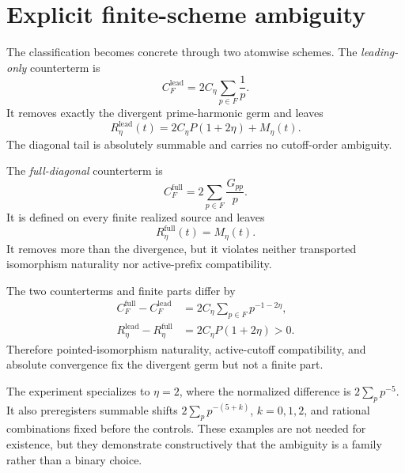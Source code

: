 \section{Explicit finite-scheme ambiguity}
\label{sec:schemes}

The classification becomes concrete through two atomwise schemes.  The
\emph{leading-only} counterterm is
\begin{equation}
 C_F^{\mathrm{lead}}
 =2C_\eta\sum_{p\in F}\frac1p.
 \label{eq:lead-counterterm}
\end{equation}
It removes exactly the divergent prime-harmonic germ and leaves
\begin{equation}
 R_\eta^{\mathrm{lead}}(t)
 =2C_\eta P(1+2\eta)+M_\eta(t).
 \label{eq:lead-fp}
\end{equation}
The diagonal tail is absolutely summable and carries no cutoff-order
ambiguity.

The \emph{full-diagonal} counterterm is
\begin{equation}
 C_F^{\mathrm{full}}
 =2\sum_{p\in F}\frac{G_{pp}}p.
 \label{eq:full-counterterm}
\end{equation}
It is defined on every finite realized source and leaves
\begin{equation}
 R_\eta^{\mathrm{full}}(t)=M_\eta(t).
 \label{eq:full-fp}
\end{equation}
It removes more than the divergence, but it violates neither transported
isomorphism naturality nor active-prefix compatibility.

\begin{corollary}
\label{cor:scheme-shift}
The two counterterms and finite parts differ by
\begin{align}
 C_F^{\mathrm{full}}-C_F^{\mathrm{lead}}
 &=2C_\eta\sum_{p\in F}p^{-1-2\eta},
 \label{eq:finite-shift-cutoff}\\
 R_\eta^{\mathrm{lead}}-R_\eta^{\mathrm{full}}
 &=2C_\eta P(1+2\eta)>0.
 \label{eq:finite-shift-limit}
\end{align}
Therefore pointed-isomorphism naturality, active-cutoff compatibility, and
absolute convergence fix the divergent germ but not a finite part.
\end{corollary}

The experiment specializes to $\eta=2$, where the normalized difference is
$2\sum_pp^{-5}$.  It also preregisters summable shifts
$2\sum_pp^{-(5+k)}$, $k=0,1,2$, and rational combinations fixed before the
controls.  These examples are not needed for existence, but they demonstrate
constructively that the ambiguity is a family rather than a binary choice.

